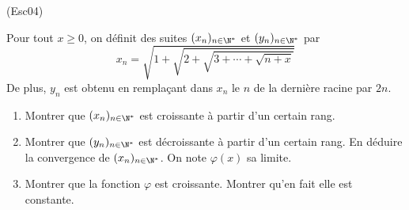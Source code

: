 \begin{tiny}(Esc04)\end{tiny} Pour tout $x\geq 0$, on définit des suites $(x_{n})_{n\in \N^{*}}$ et $(y_{n})_{n\in \N^{*}}$ par
\begin{displaymath}
x_{n}=\sqrt{1+\sqrt{2+\sqrt{3+\cdots+\sqrt{n +x}}}}
\end{displaymath}
De plus, $y_{n}$ est obtenu en remplaçant dans $x_{n}$ le $n$ de la dernière racine par $2n$.
\begin{enumerate}
  \item Montrer que $(x_{n})_{n\in \N^{*}}$ est croissante à partir d'un certain rang.
  \item Montrer que $(y_{n})_{n\in \N^{*}}$ est décroissante à partir d'un certain rang. En déduire la convergence de $(x_{n})_{n\in \N^{*}}$. On note $\varphi(x)$ sa limite.
  \item Montrer que la fonction $\varphi$ est croissante. Montrer qu'en fait elle est constante.
\end{enumerate}
